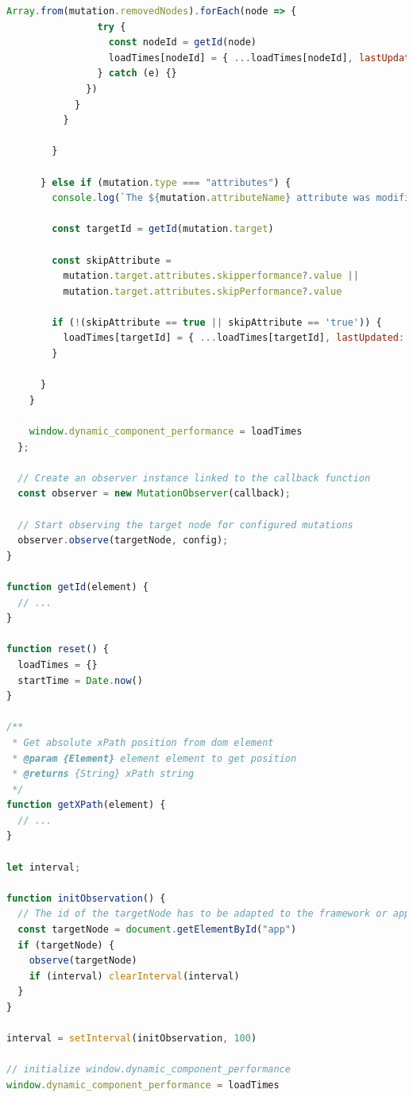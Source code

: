 \documentclass[a4paper, 10pt]{article}
\begin{document}
\begin{lstlisting}[caption={Injected mutation recorder script}, label={lst:performance-recorder}, language=JavaScript]
              Array.from(mutation.removedNodes).forEach(node => {
                try {
                  const nodeId = getId(node)
                  loadTimes[nodeId] = { ...loadTimes[nodeId], lastUpdated: Date.now() - startTime, xpath: loadTimes[nodeId]?.xpath || getXPath(node) }
                } catch (e) {}
              })
            }
          }

        }

      } else if (mutation.type === "attributes") {
        console.log(`The ${mutation.attributeName} attribute was modified.`, mutation);

        const targetId = getId(mutation.target)

        const skipAttribute =
          mutation.target.attributes.skipperformance?.value ||
          mutation.target.attributes.skipPerformance?.value

        if (!(skipAttribute == true || skipAttribute == 'true')) {
          loadTimes[targetId] = { ...loadTimes[targetId], lastUpdated: Date.now() - startTime, xpath: loadTimes[targetId]?.xpath || getXPath(mutation.target) }
        }

      }
    }

    window.dynamic_component_performance = loadTimes
  };

  // Create an observer instance linked to the callback function
  const observer = new MutationObserver(callback);

  // Start observing the target node for configured mutations
  observer.observe(targetNode, config);
}

function getId(element) {
  // ...
}

function reset() {
  loadTimes = {}
  startTime = Date.now()
}

/**
 * Get absolute xPath position from dom element
 * @param {Element} element element to get position
 * @returns {String} xPath string
 */
function getXPath(element) {
  // ...
}

let interval;

function initObservation() {
  // The id of the targetNode has to be adapted to the framework or application
  const targetNode = document.getElementById("app")
  if (targetNode) {
    observe(targetNode)
    if (interval) clearInterval(interval)
  }
}

interval = setInterval(initObservation, 100)

// initialize window.dynamic_component_performance
window.dynamic_component_performance = loadTimes
\end{lstlisting}
\end{document}
